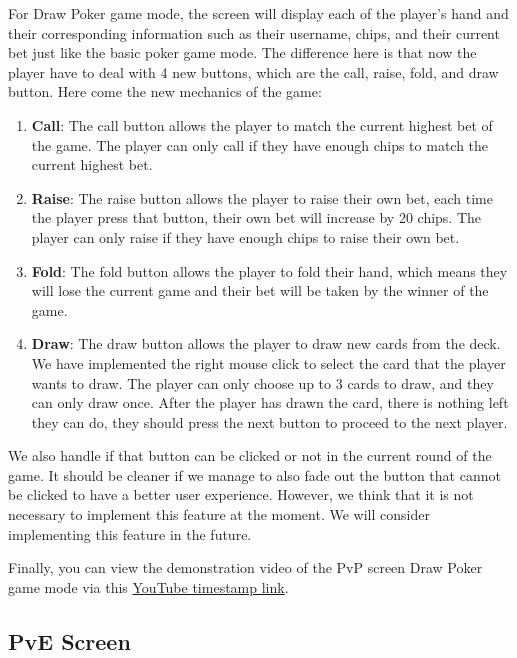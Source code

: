 \hspace{1cm} For Draw Poker game mode, the screen will display each of the player's hand and their corresponding information such as their username, chips, and their current bet just like the basic poker game mode. The difference here is that now the player have to deal with 4 new buttons, which are the call, raise, fold, and draw button. Here come the new mechanics of the game:
\begin{enumerate}
    \item \textbf{Call}: The call button allows the player to match the current highest bet of the game. The player can only call if they have enough chips to match the current highest bet.
    \item \textbf{Raise}: The raise button allows the player to raise their own bet, each time the player press that button, their own bet will increase by 20 chips. The player can only raise if they have enough chips to raise their own bet.
    \item \textbf{Fold}: The fold button allows the player to fold their hand, which means they will lose the current game and their bet will be taken by the winner of the game.
    \item \textbf{Draw}: The draw button allows the player to draw new cards from the deck. We have implemented the right mouse click to select the card that the player wants to draw. The player can only choose up to 3 cards to draw, and they can only draw once. After the player has drawn the card, there is nothing left they can do, they should press the next button to proceed to the next player.
\end{enumerate}

\hspace{1cm} We also handle if that button can be clicked or not in the current round of the game. It should be cleaner if we manage to also fade out the button that cannot be clicked to have a better user experience. However, we think that it is not necessary to implement this feature at the moment. We will consider implementing this feature in the future.

\vspace{0.5cm}

\hspace{1cm} Finally, you can view the demonstration video of the PvP screen Draw Poker game mode via this \href{https://youtu.be/OA0v6xG21N4?t=308}{YouTube timestamp link}.

\subsection{PvE Screen}
\label{subsec:pve-screen}

